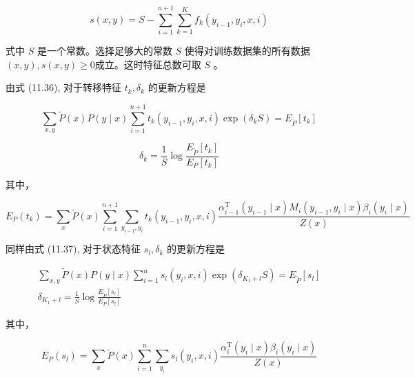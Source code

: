 \documentclass[10pt]{article}
\begin{document}
\begin{CJK*}{UTF8}{bsmi}
\begin{equation*}
s(x, y)=S-\sum_{i=1}^{n+1} \sum_{k=1}^{K} f_{k}\left(y_{i-1}, y_{i}, x, i\right) \tag{11.39}
\end{equation*}


式中 $S$ 是一个常数。选择足够大的常数 $S$ 使得对训练数据集的所有数据 $(x, y), s(x, y) \geqslant 0$成立。这时特征总数可取 $S$ 。

由式 (11.36), 对于转移特征 $t_{k}, \delta_{k}$ 的更新方程是


\begin{equation*}
\sum_{x, y} \tilde{P}(x) P(y \mid x) \sum_{i=1}^{n+1} t_{k}\left(y_{i-1}, y_{i}, x, i\right) \exp \left(\delta_{k} S\right)=E_{\tilde{P}}\left[t_{k}\right] \tag{11.40}
\end{equation*}



\begin{equation*}
\delta_{k}=\frac{1}{S} \log \frac{E_{\tilde{P}}\left[t_{k}\right]}{E_{P}\left[t_{k}\right]} \tag{11.41}
\end{equation*}


其中，


\begin{equation*}
E_{P}\left(t_{k}\right)=\sum_{x} \tilde{P}(x) \sum_{i=1}^{n+1} \sum_{y_{i-1}, y_{i}} t_{k}\left(y_{i-1}, y_{i}, x, i\right) \frac{\alpha_{i-1}^{\mathrm{T}}\left(y_{i-1} \mid x\right) M_{i}\left(y_{i-1}, y_{i} \mid x\right) \beta_{i}\left(y_{i} \mid x\right)}{Z(x)} \tag{11.42}
\end{equation*}


同样由式 (11.37), 对于状态特征 $s_{l}, \delta_{k}$ 的更新方程是


\begin{gather*}
\sum_{x, y} \tilde{P}(x) P(y \mid x) \sum_{i=1}^{n} s_{l}\left(y_{i}, x, i\right) \exp \left(\delta_{K_{1}+l} S\right)=E_{\tilde{P}}\left[s_{l}\right]  \tag{11.43}\\
\delta_{K_{1}+l}=\frac{1}{S} \log \frac{E_{\tilde{P}}\left[s_{l}\right]}{E_{P}\left[s_{l}\right]} \tag{11.44}
\end{gather*}


其中，


\begin{equation*}
E_{P}\left(s_{l}\right)=\sum_{x} \tilde{P}(x) \sum_{i=1}^{n} \sum_{y_{i}} s_{l}\left(y_{i}, x, i\right) \frac{\alpha_{i}^{\mathrm{T}}\left(y_{i} \mid x\right) \beta_{i}\left(y_{i} \mid x\right)}{Z(x)} \tag{11.45}
\end{equation*}



\end{CJK*}
\end{document}
